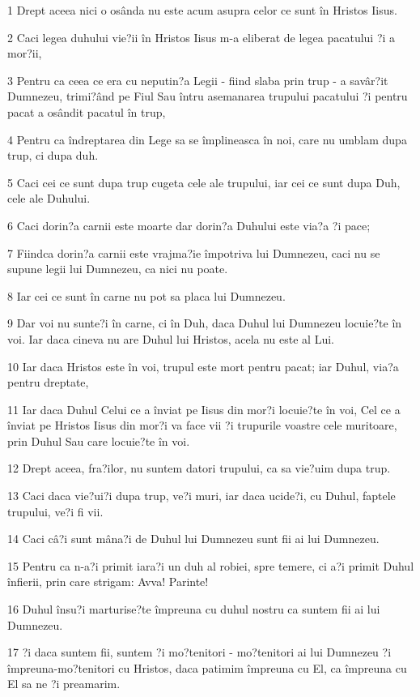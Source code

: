 \par 1 Drept aceea nici o osânda nu este acum asupra celor ce sunt în Hristos Iisus.
\par 2 Caci legea duhului vie?ii în Hristos Iisus m-a eliberat de legea pacatului ?i a mor?ii,
\par 3 Pentru ca ceea ce era cu neputin?a Legii - fiind slaba prin trup - a savâr?it Dumnezeu, trimi?ând pe Fiul Sau întru asemanarea trupului pacatului ?i pentru pacat a osândit pacatul în trup,
\par 4 Pentru ca îndreptarea din Lege sa se împlineasca în noi, care nu umblam dupa trup, ci dupa duh.
\par 5 Caci cei ce sunt dupa trup cugeta cele ale trupului, iar cei ce sunt dupa Duh, cele ale Duhului.
\par 6 Caci dorin?a carnii este moarte dar dorin?a Duhului este via?a ?i pace;
\par 7 Fiindca dorin?a carnii este vrajma?ie împotriva lui Dumnezeu, caci nu se supune legii lui Dumnezeu, ca nici nu poate.
\par 8 Iar cei ce sunt în carne nu pot sa placa lui Dumnezeu.
\par 9 Dar voi nu sunte?i în carne, ci în Duh, daca Duhul lui Dumnezeu locuie?te în voi. Iar daca cineva nu are Duhul lui Hristos, acela nu este al Lui.
\par 10 Iar daca Hristos este în voi, trupul este mort pentru pacat; iar Duhul, via?a pentru dreptate,
\par 11 Iar daca Duhul Celui ce a înviat pe Iisus din mor?i locuie?te în voi, Cel ce a înviat pe Hristos Iisus din mor?i va face vii ?i trupurile voastre cele muritoare, prin Duhul Sau care locuie?te în voi.
\par 12 Drept aceea, fra?ilor, nu suntem datori trupului, ca sa vie?uim dupa trup.
\par 13 Caci daca vie?ui?i dupa trup, ve?i muri, iar daca ucide?i, cu Duhul, faptele trupului, ve?i fi vii.
\par 14 Caci câ?i sunt mâna?i de Duhul lui Dumnezeu sunt fii ai lui Dumnezeu.
\par 15 Pentru ca n-a?i primit iara?i un duh al robiei, spre temere, ci a?i primit Duhul înfierii, prin care strigam: Avva! Parinte!
\par 16 Duhul însu?i marturise?te împreuna cu duhul nostru ca suntem fii ai lui Dumnezeu.
\par 17 ?i daca suntem fii, suntem ?i mo?tenitori - mo?tenitori ai lui Dumnezeu ?i împreuna-mo?tenitori cu Hristos, daca patimim împreuna cu El, ca împreuna cu El sa ne ?i preamarim.
